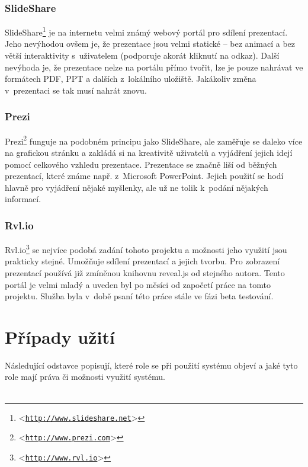\documentclass[11pt,twoside,a4paper]{book}
\let\oldUrl\url									%
\renewcommand\url[1]{<\texttt{\oldUrl{#1}}>}
\begin{document}
\subsection{SlideShare}
SlideShare\footnote{\url{http://www.slideshare.net}} je na internetu velmi známý webový portál pro sdílení prezentací. Jeho nevýhodou ovšem je, že
prezentace jsou velmi statické – bez animací a bez větší interaktivity s~uživatelem (podporuje akorát kliknutí na
odkaz). Další nevýhoda je, že prezentace nelze na portálu přímo tvořit, lze je pouze nahrávat ve formátech PDF, PPT a
dalších z~lokálního uložiště. Jakákoliv změna v~prezentaci se tak musí nahrát znovu.

\subsection{Prezi}
Prezi\footnote{\url{http://www.prezi.com}} funguje na podobném principu jako SlideShare, ale zaměřuje se daleko více na grafickou stránku a zakládá si na
kreativitě uživatelů a vyjádření jejich idejí pomocí celkového vzhledu prezentace. Prezentace se značně liší od běžných
prezentací, které známe např. z~Microsoft PowerPoint. Jejich použití se hodí hlavně pro vyjádření nějaké myšlenky, ale už ne tolik k~podání nějakých informací.

\subsection{Rvl.io}
Rvl.io\footnote{\url{http://www.rvl.io}} se nejvíce podobá zadání tohoto projektu a možnosti jeho využití jsou prakticky stejné. Umožňuje sdílení prezentací a jejich tvorbu. Pro zobrazení prezentací používá již zmíněnou knihovnu reveal.js od stejného autora. Tento portál je velmi mladý a uveden byl po měsíci od započetí práce na tomto projektu. Služba byla v~době psaní této práce stále ve fázi beta testování.


\chapter{Případy užití}
Následující odstavce popisují, které role se při použití systému objeví a jaké tyto role mají práva či možnosti využití systému.\\\\
\end{document}
